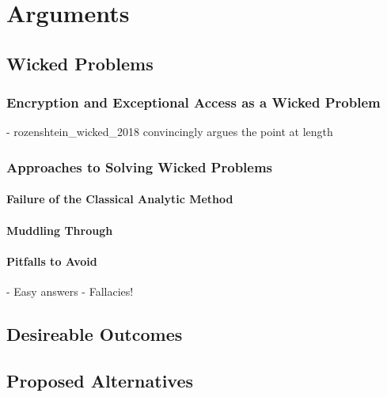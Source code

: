\chapter{Arguments}
\label{chap-arguments}

\section{Wicked Problems}

\subsection{Encryption and Exceptional Access as a Wicked Problem}

- rozenshtein_wicked_2018 convincingly argues the point at length

\subsection{Approaches to Solving Wicked Problems}

\subsubsection{Failure of the Classical Analytic Method}

\subsubsection{Muddling Through}


\subsubsection{Pitfalls to Avoid}

- Easy answers
- Fallacies!


\section{Desireable Outcomes}

\section{Proposed Alternatives}


